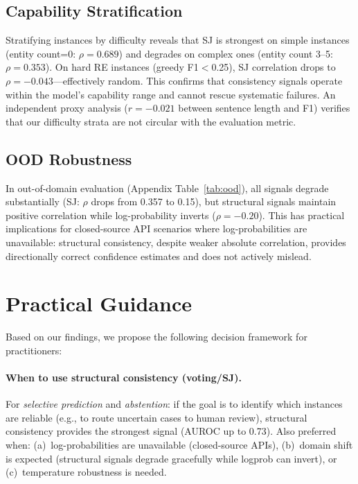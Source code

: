 \documentclass[11pt,a4paper]{article}
\begin{document}
\subsection{Capability Stratification}
\label{sec:stratification}

Stratifying instances by difficulty reveals that SJ is strongest on simple instances (entity count=0: $\rho{=}0.689$) and degrades on complex ones (entity count 3--5: $\rho{=}0.353$).
On hard RE instances (greedy F1$<$0.25), SJ correlation drops to $\rho{=}{-}0.043$---effectively random.
This confirms that consistency signals operate within the model's capability range and cannot rescue systematic failures.
An independent proxy analysis ($r{=}{-}0.021$ between sentence length and F1) verifies that our difficulty strata are not circular with the evaluation metric.

\subsection{OOD Robustness}
\label{sec:ood}

In out-of-domain evaluation (Appendix Table~\ref{tab:ood}), all signals degrade substantially (SJ: $\rho$ drops from 0.357 to 0.15), but structural signals maintain positive correlation while log-probability inverts ($\rho{=}{-}0.20$).
This has practical implications for closed-source API scenarios where log-probabilities are unavailable: structural consistency, despite weaker absolute correlation, provides directionally correct confidence estimates and does not actively mislead.

\section{Practical Guidance}
\label{sec:practical}

Based on our findings, we propose the following decision framework for practitioners:

\paragraph{When to use structural consistency (voting/SJ).}
For \emph{selective prediction} and \emph{abstention}: if the goal is to identify which instances are reliable (e.g., to route uncertain cases to human review), structural consistency provides the strongest signal (AUROC up to 0.73).
Also preferred when: (a)~log-probabilities are unavailable (closed-source APIs), (b)~domain shift is expected (structural signals degrade gracefully while logprob can invert), or (c)~temperature robustness is needed.
\end{document}

